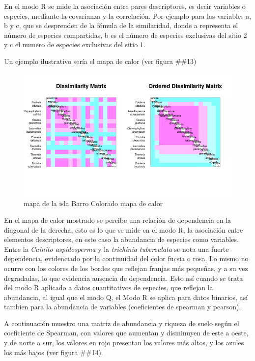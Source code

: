 \documentclass[11pt,]{article}
\begin{document}
En el modo R se mide la asociación entre pares descriptores, es decir
variables o especies, mediante la covarianza y la correlación. Por
ejemplo para las variables a, b y c, que se desprenden de la fómula de
la similaridad, donde a representa el número de especies compartidas, b
es el número de especies exclusivas del sitio 2 y c el numero de
especies exclusivas del sitio 1.

Un ejemplo ilustrativo sería el mapa de calor (ver figura \#\#13)

\begin{figure}
\centering
\includegraphics[width=1.00000\textwidth]{mapadecalor.png}
\caption{mapa de la isla Barro Colorado mapa de calor
\label{fig:bci_map}}
\end{figure}

En el mapa de calor mostrado se percibe una relación de dependencia en
la diagonal de la derecha, esto es lo que se mide en el modo R, la
asociación entre elementos descriptores, en este caso la abundancia de
especies como variables. Entre la \emph{Cainito aspidosperma} y la
\emph{trichinia tuberculata} se nota una fuerte dependencia, evidenciado
por la continuidad del color fucsia o rosa. Lo mismo no ocurre con los
colores de los bordes que reflejan franjas más pequeñas, y a su vez
degradadas, lo que evidencia ausencia de dependencia. Esto así cuando se
trata del modo R aplicado a datos cuantitativos de especies, que
reflejan la abundancia, al igual que el modo Q, el Modo R se aplica para
datos binarios, así tambien para la abundancia de variables
(coeficientes de spearman y pearson).

A continuación muestro una matriz de abundancia y riqueza de suelo según
el coeficiente de Spearman, con valores que aumentan y disminuyen de
este a oeste, y de norte a sur, los valores en rojo presentan los
valores más altos, y los azules los más bajos (ver figura \#\#14).
\end{document}

